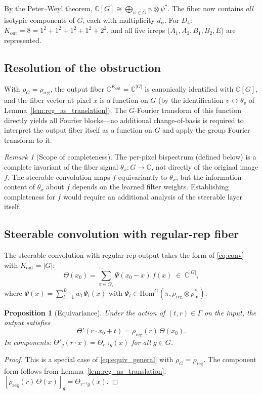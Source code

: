 \documentclass{article}
\newtheorem{proposition}[theorem]{Proposition}
\theoremstyle{definition}
\theoremstyle{remark}
\newtheorem{remark}[theorem]{Remark}
\newcommand{\C}{\mathbb{C}}
\newcommand{\Ghat}{\widehat{G}}
\newcommand{\Hom}{\mathrm{Hom}}
\begin{document}
By the Peter--Weyl theorem, $\C[G] \cong \bigoplus_{\psi \in \Ghat} \psi \otimes \psi^*$. The fiber now contains \textit{all} isotypic components of $G$, each with multiplicity $d_\psi$. For $D_4$: $K_{\mathrm{out}} = 8 = 1^2 + 1^2 + 1^2 + 1^2 + 2^2$, and all five irreps ($A_1, A_2, B_1, B_2, E$) are represented.

\subsection{Resolution of the obstruction}

With $\rho_G = \rho_{\mathrm{reg}}$, the output fiber $\C^{K_{\mathrm{out}}} = \C^{|G|}$ is canonically identified with $\C[G]$, and the fiber vector at pixel $x$ is a function on $G$ (by the identification $v \leftrightarrow \theta_v$ of Lemma~\ref{lem:reg_as_translation}). The $G$-Fourier transform of this function directly yields all Fourier blocks---no additional change-of-basis is required to interpret the output fiber itself as a function on $G$ and apply the group Fourier transform to it.

\begin{remark}[Scope of completeness]\label{rem:scope}
The per-pixel bispectrum (defined below) is a complete invariant of the fiber signal $\theta_x : G \to \C$, not directly of the original image $f$. The steerable convolution maps $f$ equivariantly to $\theta_x$, but the information content of $\theta_x$ about $f$ depends on the learned filter weights. Establishing completeness for $f$ would require an additional analysis of the steerable layer itself.
\end{remark}

\subsection{Steerable convolution with regular-rep fiber}

The steerable convolution with regular-rep output takes the form of \eqref{eq:conv} with $K_{\mathrm{out}} = |G|$:
\begin{equation}\label{eq:conv_reg}
\Theta(x_0) = \sum_{x \in \Omega_s} \Psi(x_0 - x)\, f(x) \;\in\; \C^{|G|},
\end{equation}
where $\Psi(x) = \sum_{l=1}^L w_l\, \Psi_l(x)$ with $\Psi_l \in \Hom^G(\pi, \rho_{\mathrm{reg}} \otimes \rho_{\mathrm{in}}^*)$.

\begin{proposition}[Equivariance]\label{prop:equiv_reg}
Under the action of $(t, r) \in \Gamma$ on the input, the output satisfies
\[
\Theta'(r \cdot x_0 + t) = \rho_{\mathrm{reg}}(r)\, \Theta(x_0).
\]
In components: $\Theta'_g(r \cdot x) = \Theta_{r^{-1}g}(x)$ for all $g \in G$.
\end{proposition}
\begin{proof}
This is a special case of \eqref{eq:equiv_general} with $\rho_G = \rho_{\mathrm{reg}}$. The component form follows from Lemma~\ref{lem:reg_as_translation}: $[\rho_{\mathrm{reg}}(r)\, \Theta(x)]_g = \Theta_{r^{-1}g}(x)$.
\end{proof}
\end{document}
